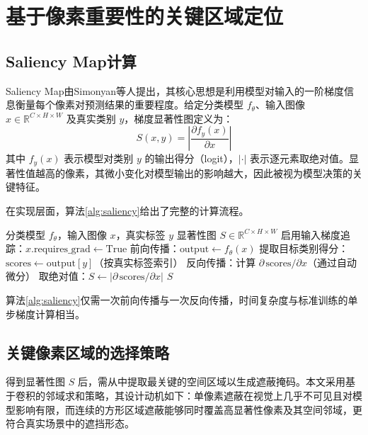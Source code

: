 \section{基于像素重要性的关键区域定位}

\subsection{Saliency Map计算}

Saliency Map由Simonyan等人\cite{simonyan2014saliency}提出，其核心思想是利用模型对输入的一阶梯度信息衡量每个像素对预测结果的重要程度。给定分类模型 $f_{\theta}$、输入图像 $x \in \mathbb{R}^{C \times H \times W}$ 及真实类别 $y$，梯度显著性图定义为：
\begin{equation}
  S(x, y) = \left| \frac{\partial f_y(x)}{\partial x} \right|
  \label{eq:saliency}
\end{equation}
其中 $f_y(x)$ 表示模型对类别 $y$ 的输出得分（logit），$|\cdot|$ 表示逐元素取绝对值。显著性值越高的像素，其微小变化对模型输出的影响越大，因此被视为模型决策的关键特征。

在实现层面，算法\ref{alg:saliency}给出了完整的计算流程。

\begin{algorithm}[htbp]
  \caption{Saliency Map计算}
  \label{alg:saliency}
  \begin{algorithmic}[1]
    \Require 分类模型 $f_{\theta}$，输入图像 $x$，真实标签 $y$
    \Ensure 显著性图 $S \in \mathbb{R}^{C \times H \times W}$
    \State 启用输入梯度追踪：$x.\text{requires\_grad} \leftarrow \text{True}$
    \State 前向传播：$\text{output} \leftarrow f_{\theta}(x)$
    \State 提取目标类别得分：$\text{scores} \leftarrow \text{output}[y]$（按真实标签索引）
    \State 反向传播：计算 $\partial\,\text{scores} / \partial x$（通过自动微分）
    \State 取绝对值：$S \leftarrow \left| \partial\,\text{scores} / \partial x \right|$
    \State \Return $S$
  \end{algorithmic}
\end{algorithm}

算法\ref{alg:saliency}仅需一次前向传播与一次反向传播，时间复杂度与标准训练的单步梯度计算相当。

\subsection{关键像素区域的选择策略}

得到显著性图 $S$ 后，需从中提取最关键的空间区域以生成遮蔽掩码。本文采用基于卷积的邻域求和策略，其设计动机如下：单像素遮蔽在视觉上几乎不可见且对模型影响有限，而连续的方形区域遮蔽能够同时覆盖高显著性像素及其空间邻域，更符合真实场景中的遮挡形态。

